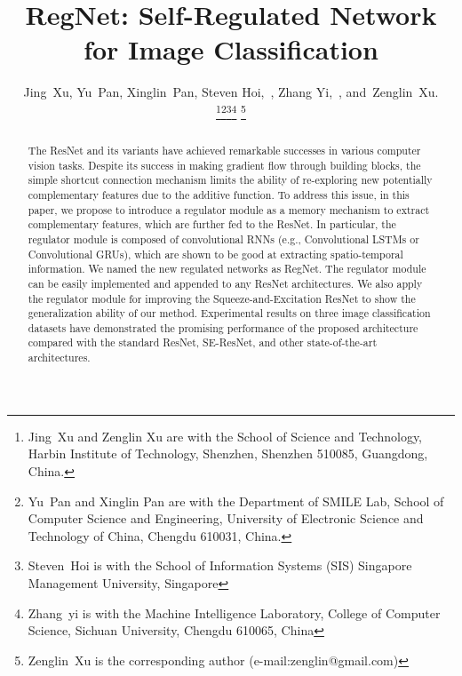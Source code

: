 \documentclass[journal,comsoc]{IEEEtran}
\begin{document}
\title{RegNet: Self-Regulated Network for Image Classification}


\author{Jing~Xu,
        Yu~Pan,
        Xinglin~Pan,
        Steven Hoi,~,
        Zhang Yi,~,
        and~Zenglin~Xu.

\thanks{Jing~Xu and Zenglin Xu are with the School of Science and Technology, Harbin Institute of Technology, Shenzhen, Shenzhen 510085, Guangdong, China.}\thanks{Yu~Pan and Xinglin Pan are with the Department of SMILE Lab, School of Computer Science and Engineering, University of Electronic Science and Technology of China, Chengdu 610031, China.}\thanks{Steven~Hoi is with the School of Information Systems (SIS)
Singapore Management University, Singapore}\thanks{Zhang~yi is with the Machine Intelligence Laboratory, College of Computer Science, Sichuan University, Chengdu 610065, China}
\thanks{Zenglin~Xu is the corresponding author (e-mail:zenglin@gmail.com)}}



























\maketitle

\begin{abstract}
The ResNet and its variants have achieved remarkable successes in various computer vision tasks. Despite its success in making gradient flow through building blocks, the simple shortcut connection mechanism limits the ability of re-exploring new potentially complementary features due to the additive function. To address this issue, in this paper, we propose to introduce a regulator module as a memory mechanism to extract complementary features, which are further fed to the ResNet. In particular, the regulator module is composed of convolutional RNNs (e.g., Convolutional LSTMs or Convolutional GRUs), which are shown to be good at extracting spatio-temporal information. We named the new regulated networks as RegNet. The regulator module can be easily implemented and appended to any ResNet architectures. We also apply the regulator module for improving the Squeeze-and-Excitation ResNet to show the generalization ability of our method. Experimental results on three image classification datasets have demonstrated the promising performance of the proposed architecture compared with the standard ResNet, SE-ResNet, and other state-of-the-art architectures. 
\end{abstract}
\end{document}
